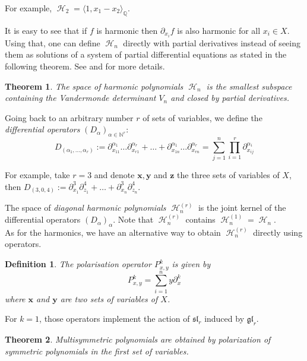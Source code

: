 \documentclass[letter,12pt]{article}
\newcommand{\pauline}[1]{\todo[linecolor=blue,backgroundcolor=blue!25,bordercolor=blue]{#1}}
\newcommand{\NN}{\mathbb{N}}
\newcommand{\QQ}{\mathbb{Q}}
\DeclareMathOperator{\harmonics}{\mathcal{H}}
\newtheorem{theorem}{Theorem}
\newtheorem{definition}{Definition}
\begin{document}
	For example, $\harmonics_2 = \langle 1, x_1-x_2 \rangle_\QQ$. 
	
	It is easy to see that if $f$ is harmonic then $\partial_{x_i} f$ is also harmonic for all $x_i \in X$. Using that, one can define $\harmonics_{n}$ directly with  partial derivatives instead of seeing them as solutions of a system of partial differential equations as stated in the following theorem. See \cite{Haiman2002} and \cite{Bergeron2009} for more details. 
	
	\begin{theorem}
		The space of harmonic polynomials $\harmonics_{n}$ is the smallest subspace containing the Vandermonde determinant $V_n$ and closed by partial derivatives.
	\end{theorem}
	
	Going back to an arbitrary number $r$ of sets of variables, we define the \emph{differential operators} $(D_\alpha)_{\alpha\in \NN^r}$:
	$$D_{(\alpha_1, \dots, \alpha_r)} := \partial_{x_{11}}^{\alpha_1}\dots\partial_{x_{r1}}^{\alpha_r} + \dots + \partial_{x_{1n}}^{\alpha_1}\dots\partial_{x_{rn}}^{\alpha_r} = \sum_{j=1}^{n} \prod_{i=1}^{r} \partial_{x_{ij}}^{\alpha_i}$$
	
	For example, take $r=3$ and denote $\bm{x}, \bm{y}$ and $\bm{z}$ the three sets of variables of $X$, then $D_{(3,0,4)} := \partial_{x_1}^3\partial_{z_1}^4 + \dots + \partial_{x_n}^3\partial_{z_n}^4$. 
	
	The space of \emph{diagonal harmonic polynomials} $\harmonics_n^{(r)}$ is the joint kernel of the differential operators $(D_\alpha)_\alpha$. Note that $\harmonics_n^{(r)}$ contains $\harmonics_{n}^{(1)} = \harmonics_{n}$.\\
	
	As for the harmonics, we have an alternative way to obtain $\harmonics_n^{(r)}$ directly using operators. 
	
	\begin{definition}
		The \emph{polarisation operator} $P_{x,y}^k$ is given by
		$$P_{x,y}^k = \sum_{i=1}^{n} y \partial_{x}^k$$
		where $\bm{x}$ and $\bm{y}$ are two sets of variables of $X$. 
	\end{definition}
	
	For $k=1$, those operators implement the action of $\mathfrak{sl}_r$ induced by $\mathfrak{gl}_r$.
	
	\begin{theorem} \pauline{Ref for this theorem.}
		Multisymmetric polynomials are obtained by polarization of symmetric polynomials in the first set of variables.
	\end{theorem}
	
\end{document}
